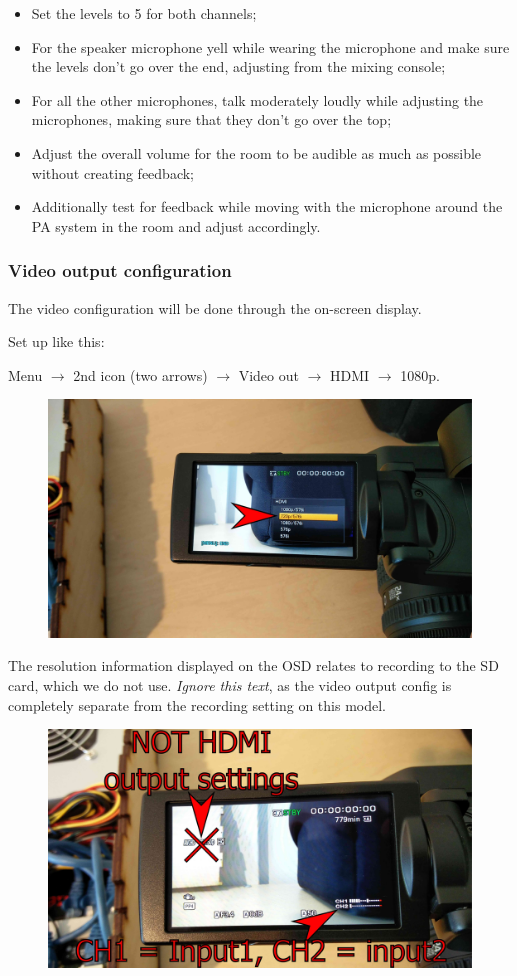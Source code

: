 \documentclass{article}
\begin{document}
\begin{itemize}
  \item Set the levels to 5 for both channels;
  \item For the speaker microphone yell while wearing the microphone and make sure the levels don't go over the end, adjusting from the mixing console;
  \item For all the other microphones, talk moderately loudly while adjusting the microphones, making sure that they don't go over the top;
  \item Adjust the overall volume for the room to be audible as much as possible without creating feedback;
  \item Additionally test for feedback while moving with the microphone around the PA system in the room and adjust accordingly.
\end{itemize}

\subsubsection{Video output configuration}
The video configuration will be done through the on-screen display.

Set up like this:

Menu $\rightarrow$ 2nd icon (two arrows) $\rightarrow$ Video out $\rightarrow$ HDMI $\rightarrow$ 1080p.
\begin{figure}[H]
  \centering
\includegraphics[width = 120mm]{Sony05.jpg}
\end{figure}

The resolution information displayed on the OSD relates to recording to the SD card, which we do not use. \emph{Ignore this text}, as the video output config is completely separate from the recording setting on this model.
\begin{figure}[H]
  \centering
\includegraphics[width = 120mm]{Sony06.jpg}
\end{figure}
\end{document}
